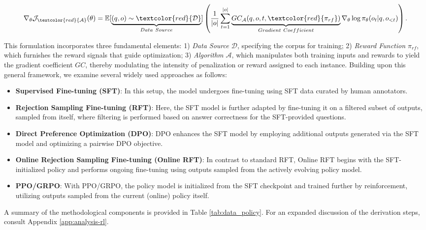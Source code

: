 \begin{equation}
    \nabla_{\theta}\mathcal{J}_{\textcolor{red}{\mathcal{A}}}(\theta) = \mathbb{E}[\underbrace{(q,o) \sim \textcolor{red}{\mathcal{D}}}_{Data \ Source}]\left( \frac{1}{|o|} \sum_{t=1}^{|o|}  \underbrace{GC_{{\mathcal{A}}}(q, o, t, \textcolor{red}{\pi_{{rf}}})}_{Gradient \ Coefficient}  \nabla_{\theta}\log \pi_{\theta}(o_t | q, o_{<t})\right).
\label{eq:objective}
\end{equation}

This formulation incorporates three fundamental elements: 1) \textit{Data Source $\mathcal{D}$}, specifying the corpus for training; 2) \textit{Reward Function $\pi_{{rf}}$}, which furnishes the reward signals that guide optimization; 3) \textit{Algorithm $\mathcal{A}$}, which manipulates both training inputs and rewards to yield the gradient coefficient $GC$, thereby modulating the intensity of penalization or reward assigned to each instance. Building upon this general framework, we examine several widely used approaches as follows:

\begin{itemize}
    \item  \textbf{Supervised Fine-tuning (SFT)}: In this setup, the model undergoes fine-tuning using SFT data curated by human annotators.
    \item \textbf{Rejection Sampling Fine-tuning (RFT)}: Here, the SFT model is further adapted by fine-tuning it on a filtered subset of outputs, sampled from itself, where filtering is performed based on answer correctness for the SFT-provided questions.
    \item \textbf{Direct Preference Optimization (DPO)}: DPO enhances the SFT model by employing additional outputs generated via the SFT model and optimizing a pairwise DPO objective.
    \item \textbf{Online Rejection Sampling Fine-tuning (Online RFT)}: In contrast to standard RFT, Online RFT begins with the SFT-initialized policy and performs ongoing fine-tuning using outputs sampled from the actively evolving policy model.
    \item \textbf{PPO/GRPO}: With PPO/GRPO, the policy model is initialized from the SFT checkpoint and trained further by reinforcement, utilizing outputs sampled from the current (online) policy itself.
\end{itemize}

A summary of the methodological components is provided in Table \ref{tab:data_policy}. For an expanded discussion of the derivation steps, consult Appendix \ref{app:analysis-rl}.

